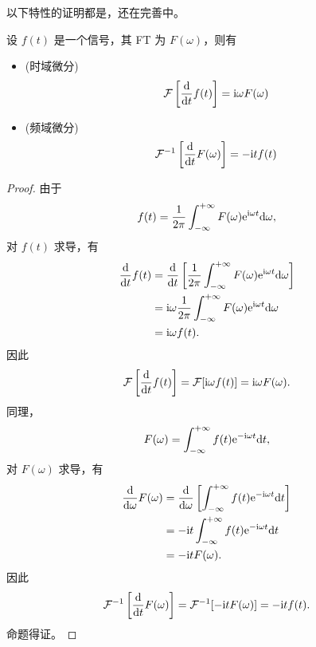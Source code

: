 \begin{note}
    以下特性的证明都是，还在完善中。
\end{note}

\begin{property}[微分特性]
    设 $f(t)$ 是一个信号，其 FT 为 $F(\omega)$，则有
    \begin{itemize}
        \item (时域微分)
            \begin{align*}
                \mathcal{F}\left[\frac{\D}{\D{t}}f(t)\right] = \mathi \omega F(\omega)
            \end{align*}
        \item (频域微分)
            \begin{align*}
                \mathcal{F}^{-1}\left[\frac{\D}{\D{t}}F(\omega)\right] = -\mathi t f(t)
            \end{align*}
    \end{itemize}
\end{property}

\begin{proof}
    由于
    \begin{align*}
        f(t) = \frac{1}{2\pi}\int_{-\infty}^{+\infty}F(\omega)\mathrm{e}^{\mathrm{i} \omega t}\mathrm{d}\omega,
    \end{align*}
    对 $f(t)$ 求导，有
    \begin{align*}
        \dfrac{\D}{\D{t}}f(t) & = \dfrac{\D}{\D{t}}\left[\frac{1}{2\pi}\int_{-\infty}^{+\infty}F(\omega)\mathe^{\mathi \omega t}\D{\omega}\right] \\
        & = \mathi \omega \frac{1}{2\pi}\int_{-\infty}^{+\infty}F(\omega)\mathe^{\mathi \omega t}\D{\omega} \\
        & = \mathi \omega f(t).
    \end{align*}
    因此
    \begin{align*}
        \mathcal{F}\left[\frac{\D}{\D{t}}f(t)\right] = \mathcal{F}[\mathi \omega f(t)] = \mathi \omega F(\omega).
    \end{align*}
    同理，
    \begin{align*}
        F(\omega) = \int_{-\infty}^{+\infty}f(t)\mathrm{e}^{-\mathrm{i} \omega t}\mathrm{d}t,
    \end{align*}
    对 $F(\omega)$ 求导，有
    \begin{align*}
        \dfrac{\D}{\D{\omega}}F(\omega) & = \dfrac{\D}{\D{\omega}}\left[\int_{-\infty}^{+\infty}f(t)\mathe^{-\mathi \omega t}\D{t}\right] \\
        & = -\mathi t \int_{-\infty}^{+\infty}f(t)\mathe^{-\mathi \omega t}\D{t} \\
        & = -\mathi t F(\omega).
    \end{align*}
    因此
    \begin{align*}
        \mathcal{F}^{-1}\left[\frac{\D}{\D{t}}F(\omega)\right] = \mathcal{F}^{-1}[-\mathi t F(\omega)] = -\mathi t f(t).
    \end{align*}
    命题得证。
\end{proof}


